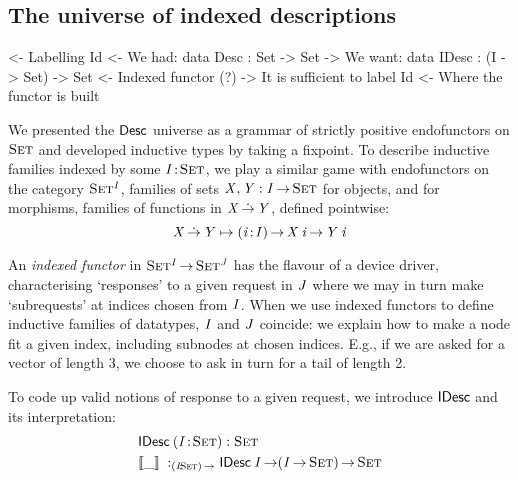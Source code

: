 

\subsection{The universe of indexed descriptions}

\begin{wstructure}
<- Labelling Id
    <- We had: data Desc : Set -> Set
    -> We want: data IDesc : (I -> Set) -> Set
        <- Indexed functor (?)
        -> It is sufficient to label Id
            <- Where the functor is built
\end{wstructure}


\newcommand{\DotTo}{\mathop{\blue{\dot{\rightarrow}}}}

We presented the $\Desc$ universe as a
grammar of strictly positive endofunctors on $\Set$ and developed
inductive types by taking a fixpoint. To describe inductive families
indexed by some $\Bhab{\V{I}}{\Set}$, we play a similar game with
endofunctors on the category $\Set^{\V{I}}$,
families of sets \(\V{X},\V{Y}:\V{I}\To\Set\) for objects, and for morphisms,
families of functions in \(\V{X}\DotTo\V{Y}\), defined pointwise:
\[
\V{X}\DotTo\V{Y} \mapsto \PI{\V{i}}{\V{I}}\V{X}\:\V{i}\To\V{Y}\:\V{i}
\]

An \emph{indexed functor} in $\Set^{\V{I}}\To\Set^{\V{J}}$ has the
flavour of a device driver, characterising `responses' to a given
request in \(\V{J}\) where we may in turn make `subrequests' at indices
chosen from \(\V{I}\). When we use indexed functors to define inductive
families of datatypes,
\(\V{I}\) and \(\V{J}\) coincide: we explain how to make a node fit a given
index, including subnodes at chosen indices. E.g., if we are asked for a
vector of length 3, we choose to ask in turn for a tail of length 2.

To code up valid notions of response to a given request, we introduce
$\SYMBIDesc$ and its interpretation:
%
\[\stk{
\IDesc{(\Bhab{\V{I}}{\Set})} : \Set \smallskip \\
\idescop{\_}{}{} : _{\PI{\V{I}}{\Set}} \IDesc{\V{I}} \To (\V{I} \To \Set) \To \Set    \\
}\]

